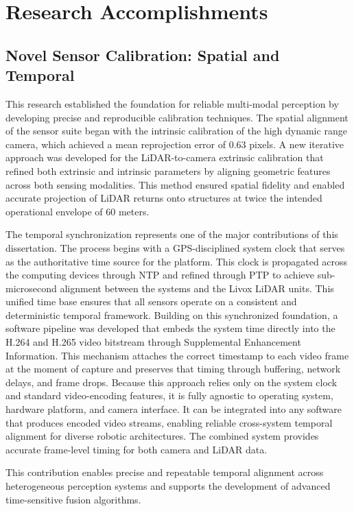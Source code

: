 \documentclass{erauthesis}
\begin{document}
\section{Research Accomplishments}
\subsection{Novel Sensor Calibration: Spatial and Temporal}

This research established the foundation for reliable multi-modal perception by developing precise and reproducible calibration techniques. The spatial alignment of the sensor suite began with the intrinsic calibration of the high dynamic range camera, which achieved a mean reprojection error of 0.63 pixels. A new iterative approach was developed for the LiDAR-to-camera extrinsic calibration that refined both extrinsic and intrinsic parameters by aligning geometric features across both sensing modalities. This method ensured spatial fidelity and enabled accurate projection of LiDAR returns onto structures at twice the intended operational envelope of 60 meters.

The temporal synchronization represents one of the major contributions of this dissertation. The process begins with a GPS-disciplined system clock that serves as the authoritative time source for the platform. This clock is propagated across the computing devices through NTP and refined through PTP to achieve sub-microsecond alignment between the systems and the Livox LiDAR units. This unified time base ensures that all sensors operate on a consistent and deterministic temporal framework. Building on this synchronized foundation, a software pipeline was developed that embeds the system time directly into the H.264 and H.265 video bitstream through Supplemental Enhancement Information. This mechanism attaches the correct timestamp to each video frame at the moment of capture and preserves that timing through buffering, network delays, and frame drops. Because this approach relies only on the system clock and standard video-encoding features, it is fully agnostic to operating system, hardware platform, and camera interface. It can be integrated into any software that produces encoded video streams, enabling reliable cross-system temporal alignment for diverse robotic architectures. The combined system provides accurate frame-level timing for both camera and LiDAR data.

This contribution enables precise and repeatable temporal alignment across heterogeneous perception systems and supports the development of advanced time-sensitive fusion algorithms.
\end{document}
